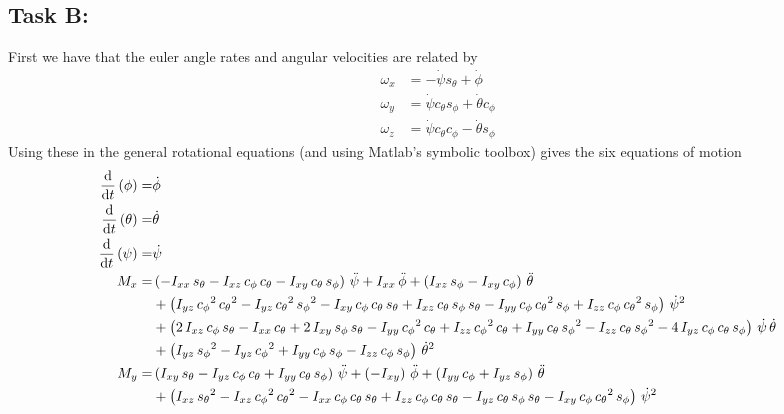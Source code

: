 \documentclass[a4paper]{article}
\begin{document}
\subsection*{Task B:}%
First we have that the euler angle rates and angular velocities are related by
\[
  \begin{aligned}
    \omega_x &= - \dot{\psi} s_{\theta} + \dot{\phi} \\
    \omega_y &= \dot{\psi} c_{\theta}s_{\phi} + \dot{\theta} c_{\phi} \\
    \omega_z &= \dot{\psi}c_{\theta}c_{\phi} - \dot{\theta}s_{\phi}
  \end{aligned}
\]
Using these in the general rotational equations (and using Matlab's symbolic toolbox) gives the six equations of motion
\[
  \begin{aligned}
    \dv{t} \left( \phi \right) =& \dot{\phi} \\ 
    \dv{t} \left( \theta \right) =& \dot{\theta} \\
    \dv{t} \left( \psi \right) =& \dot{\psi} \\
    M_x =& 
\left(-I_{xx}\,s_\theta-I_{xz}\,c_\phi\,c_\theta-I_{xy}\,c_\theta\,s_\phi\right)\,\ddot{\psi}+I_{xx}\,\ddot{\phi}+\left(I_{xz}\,s_\phi-I_{xy}\,c_\phi\right)\,\ddot{\theta} \\ 
         &+\left(I_{yz}\,{c_\phi}^2\,{c_\theta}^2-I_{yz}\,{c_\theta}^2\,{s_\phi}^2-I_{xy}\,c_\phi\,c_\theta\,s_\theta+I_{xz}\,c_\theta\,s_\phi\,s_\theta-I_{yy}\,c_\phi\,{c_\theta}^2\,s_\phi+I_{zz}\,c_\phi\,{c_\theta}^2\,s_\phi\right)\,{\dot{\psi}}^2 \\
         &+\left(2\,I_{xz}\,c_\phi\,s_\theta-I_{xx}\,c_\theta+2\,I_{xy}\,s_\phi\,s_\theta-I_{yy}\,{c_\phi}^2\,c_\theta+I_{zz}\,{c_\phi}^2\,c_\theta+I_{yy}\,c_\theta\,{s_\phi}^2-I_{zz}\,c_\theta\,{s_\phi}^2-4\,I_{yz}\,c_\phi\,c_\theta\,s_\phi\right)\,\dot{\psi}\,\dot{\theta} \\
         &+\left(I_{yz}\,{s_\phi}^2-I_{yz}\,{c_\phi}^2+I_{yy}\,c_\phi\,s_\phi-I_{zz}\,c_\phi\,s_\phi\right)\,{\dot{\theta}}^2 \\
    M_y =&
\left(I_{xy}\,s_\theta-I_{yz}\,c_\phi\,c_\theta+I_{yy}\,c_\theta\,s_\phi\right)\,\ddot{\psi}+\left(-I_{xy}\right)\,\ddot{\phi}+\left(I_{yy}\,c_\phi+I_{yz}\,s_\phi\right)\,\ddot{\theta} \\
         &+\left(I_{xz}\,{s_\theta}^2-I_{xz}\,{c_\phi}^2\,{c_\theta}^2-I_{xx}\,c_\phi\,c_\theta\,s_\theta+I_{zz}\,c_\phi\,c_\theta\,s_\theta-I_{yz}\,c_\theta\,s_\phi\,s_\theta-I_{xy}\,c_\phi\,{c_\theta}^2\,s_\phi\right)\,{\dot{\psi}}^2 \\

\end{aligned}\]
\end{document}
